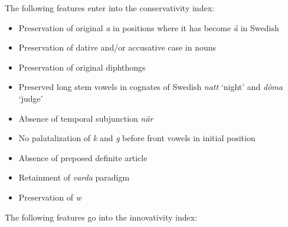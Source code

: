 The following features enter into the conservativity index:

\begin{itemize}
\item 

Preservation of original \textit{a} in positions where it has become \textit{å} in Swedish

\item 

Preservation of dative and/or accusative case in nouns

\item 

Preservation of original diphthongs

\item 

Preserved long stem vowels in cognates of Swedish \textit{natt} ‘night’ and \textit{döma} ‘judge’

\item 

Absence of temporal subjunction \textit{när}

\item 

No palatalization of \textit{k} and \textit{g} before front vowels in initial position

\item 

Absence of preposed definite article

\item 

Retainment of \textit{varda} paradigm

\item 

Preservation of \textit{w}
\end{itemize}
 

The following features go into the innovativity index:

